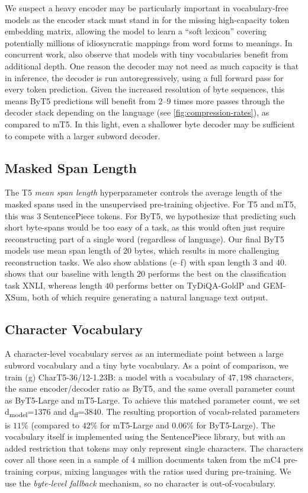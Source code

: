 \documentclass[11pt,a4paper]{article}
\begin{document}
We suspect a heavy encoder may be particularly important in vocabulary-free models as the encoder stack must stand in for the missing high-capacity token embedding matrix, allowing the model to learn a ``soft lexicon'' covering potentially millions of idiosyncratic mappings from word forms to meanings.
In concurrent work, \citet{wies-2021-transformer} also observe that models with tiny vocabularies benefit from additional depth. One reason the decoder may not need as much capacity is that in inference, the decoder is run autoregressively, using a full forward pass for every token prediction. Given the increased resolution of byte sequences, this means ByT5 predictions will benefit from $2$--$9$ times more passes through the decoder stack depending on the language (see \cref{fig:compression-rates}), as compared to mT5. In this light, even a shallower byte decoder may be sufficient to compete with a larger subword decoder.

\subsection{Masked Span Length}

The T5 \textit{mean span length} hyperparameter controls the average length of the masked spans used in the unsupervised pre-training objective. For T5 and mT5, this was $3$ SentencePiece tokens. For ByT5, we hypothesize that predicting such short byte-spans would be too easy of a task, as this would often just require reconstructing part of a single word (regardless of language). Our final ByT5 models use mean span length of $20$ bytes, which results in more challenging reconstruction tasks. We also show ablations (e--f) with span length $3$ and $40$.  shows that our baseline with length $20$ performs the best on the classification task XNLI, whereas length $40$ performs better on TyDiQA-GoldP and \mbox{GEM-XSum}, both of which require generating a natural language text output.

\subsection{Character Vocabulary}

A character-level vocabulary serves as an intermediate point between a large subword vocabulary and a tiny byte vocabulary. As a point of comparison, we train (g) CharT5-36/12-1.23B: a model with a vocabulary of $47{,}198$ characters, the same encoder/decoder ratio as ByT5, and the same overall parameter count as ByT5-Large and mT5-Large. To achieve this matched parameter count, we set d\textsubscript{model}=$1376$ and d\textsubscript{ff}=$3840$. The resulting proportion of vocab-related parameters is $11$\% (compared to $42$\% for mT5-Large and $0.06$\% for ByT5-Large). The vocabulary itself is implemented using the SentencePiece library, but with an added restriction that tokens may only represent single characters. The characters cover all those seen in a sample of $4$ million documents taken from the mC4 pre-training corpus, mixing languages with the ratios used during pre-training. We use the \textit{byte-level fallback} mechanism, so no character is out-of-vocabulary.
\end{document}
